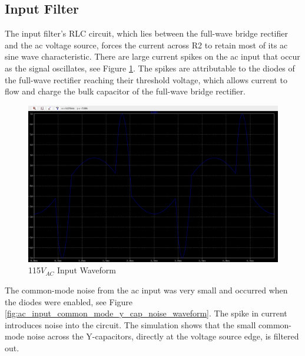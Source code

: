 \documentclass[conference]{IEEEtran}
\begin{document}
\FloatBarrier

\subsection{Input Filter}

The input filter's RLC circuit, which lies between the full-wave bridge rectifier and the ac voltage source, forces the current across R2 to retain most of its ac sine wave characteristic. There are large current spikes on the ac input that occur as the signal oscillates, see Figure \ref{fig:ac_input_waveform}. The spikes are attributable to the diodes of the full-wave rectifier reaching their threshold voltage, which allows current to flow and charge the bulk capacitor of the full-wave bridge rectifier.

\begin{figure}[h]
    \centering
    \includegraphics[width=1.0\linewidth]{ac_input_waveform.png}
    \caption{115$V_{AC}$ Input Waveform}
    \label{fig:ac_input_waveform}
\end{figure}

\FloatBarrier

The common-mode noise from the ac input was very small and occurred when the diodes were enabled, see Figure \ref{fig:ac_input_common_mode_y_cap_noise_waveform}. The spike in current introduces noise into the circuit. The simulation shows that the small common-mode noise across the Y-capacitors, directly at the voltage source edge, is filtered out.
\end{document}
